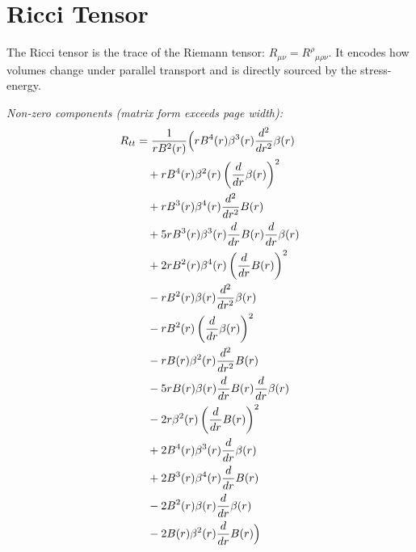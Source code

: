 \documentclass[11pt,a4paper]{article}
\begin{document}
\section{Ricci Tensor}
The Ricci tensor is the trace of the Riemann tensor: $R_{\mu\nu} = R^\rho{}_{\mu\rho\nu}$. It encodes how volumes change under parallel transport and is directly sourced by the stress-energy.
\par\noindent\textit{Non-zero components (matrix form exceeds page width):}
\begin{align*}
  R_{tt} &= \frac{1}{r B^{2}{\left(r \right)}}\Bigl(r B^{4}{\left(r \right)} \beta^{3}{\left(r \right)} \frac{d^{2}}{d r^{2}} \beta{\left(r \right)} \\
  &\quad + r B^{4}{\left(r \right)} \beta^{2}{\left(r \right)} \left(\frac{d}{d r} \beta{\left(r \right)}\right)^{2} \\
  &\quad + r B^{3}{\left(r \right)} \beta^{4}{\left(r \right)} \frac{d^{2}}{d r^{2}} B{\left(r \right)} \\
  &\quad + 5 r B^{3}{\left(r \right)} \beta^{3}{\left(r \right)} \frac{d}{d r} B{\left(r \right)} \frac{d}{d r} \beta{\left(r \right)} \\
  &\quad + 2 r B^{2}{\left(r \right)} \beta^{4}{\left(r \right)} \left(\frac{d}{d r} B{\left(r \right)}\right)^{2} \\
  &\quad - r B^{2}{\left(r \right)} \beta{\left(r \right)} \frac{d^{2}}{d r^{2}} \beta{\left(r \right)} \\
  &\quad - r B^{2}{\left(r \right)} \left(\frac{d}{d r} \beta{\left(r \right)}\right)^{2} \\
  &\quad - r B{\left(r \right)} \beta^{2}{\left(r \right)} \frac{d^{2}}{d r^{2}} B{\left(r \right)} \\
  &\quad - 5 r B{\left(r \right)} \beta{\left(r \right)} \frac{d}{d r} B{\left(r \right)} \frac{d}{d r} \beta{\left(r \right)} \\
  &\quad - 2 r \beta^{2}{\left(r \right)} \left(\frac{d}{d r} B{\left(r \right)}\right)^{2} \\
  &\quad + 2 B^{4}{\left(r \right)} \beta^{3}{\left(r \right)} \frac{d}{d r} \beta{\left(r \right)} \\
  &\quad + 2 B^{3}{\left(r \right)} \beta^{4}{\left(r \right)} \frac{d}{d r} B{\left(r \right)} \\
  &\quad - 2 B^{2}{\left(r \right)} \beta{\left(r \right)} \frac{d}{d r} \beta{\left(r \right)} \\
  &\quad - 2 B{\left(r \right)} \beta^{2}{\left(r \right)} \frac{d}{d r} B{\left(r \right)}\Bigr)
\end{align*}
\end{document}
